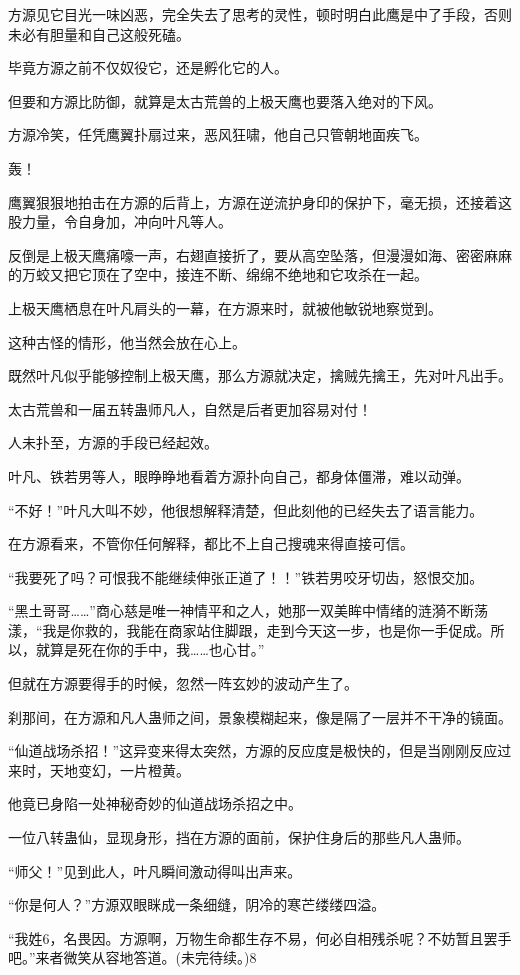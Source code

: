 \begin{this_body}
方源见它目光一味凶恶，完全失去了思考的灵性，顿时明白此鹰是中了手段，否则未必有胆量和自己这般死磕。

毕竟方源之前不仅奴役它，还是孵化它的人。

但要和方源比防御，就算是太古荒兽的上极天鹰也要落入绝对的下风。

方源冷笑，任凭鹰翼扑扇过来，恶风狂啸，他自己只管朝地面疾飞。

轰！

鹰翼狠狠地拍击在方源的后背上，方源在逆流护身印的保护下，毫无损，还接着这股力量，令自身加，冲向叶凡等人。

反倒是上极天鹰痛嚎一声，右翅直接折了，要从高空坠落，但漫漫如海、密密麻麻的万蛟又把它顶在了空中，接连不断、绵绵不绝地和它攻杀在一起。

上极天鹰栖息在叶凡肩头的一幕，在方源来时，就被他敏锐地察觉到。

这种古怪的情形，他当然会放在心上。

既然叶凡似乎能够控制上极天鹰，那么方源就决定，擒贼先擒王，先对叶凡出手。

太古荒兽和一届五转蛊师凡人，自然是后者更加容易对付！

人未扑至，方源的手段已经起效。

叶凡、铁若男等人，眼睁睁地看着方源扑向自己，都身体僵滞，难以动弹。

“不好！”叶凡大叫不妙，他很想解释清楚，但此刻他的已经失去了语言能力。

在方源看来，不管你任何解释，都比不上自己搜魂来得直接可信。

“我要死了吗？可恨我不能继续伸张正道了！！”铁若男咬牙切齿，怒恨交加。

“黑土哥哥……”商心慈是唯一神情平和之人，她那一双美眸中情绪的涟漪不断荡漾，“我是你救的，我能在商家站住脚跟，走到今天这一步，也是你一手促成。所以，就算是死在你的手中，我……也心甘。”

但就在方源要得手的时候，忽然一阵玄妙的波动产生了。

刹那间，在方源和凡人蛊师之间，景象模糊起来，像是隔了一层并不干净的镜面。

“仙道战场杀招！”这异变来得太突然，方源的反应度是极快的，但是当刚刚反应过来时，天地变幻，一片橙黄。

他竟已身陷一处神秘奇妙的仙道战场杀招之中。

一位八转蛊仙，显现身形，挡在方源的面前，保护住身后的那些凡人蛊师。

“师父！”见到此人，叶凡瞬间激动得叫出声来。

“你是何人？”方源双眼眯成一条细缝，阴冷的寒芒缕缕四溢。

“我姓6，名畏因。方源啊，万物生命都生存不易，何必自相残杀呢？不妨暂且罢手吧。”来者微笑从容地答道。(未完待续。)8

\end{this_body}

